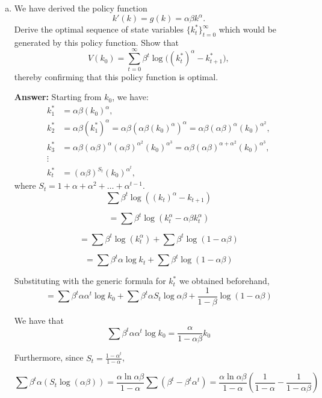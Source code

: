 \documentclass[11pt]{extarticle}
\theoremstyle{plain}
\theoremstyle{definition}
\begin{document}
\begin{enumerate}[(a)]
\begin{enumerate}[(a)]
\item We have derived the policy function
\begin{equation*}
	k'(k) = g(k) = \alpha \beta k^\alpha.
\end{equation*}
Derive the optimal sequence of state variables $\{k_t^*\}_{t=0}^\infty$ which would be generated by this policy function. Show that 
\begin{equation*}
	V(k_0) = \sum_{t=0}^\infty \beta^t \log \bigg( (k_t^*)^\alpha - k_{t+1}^* \bigg),
\end{equation*}
thereby confirming that this policy function is optimal.

\textbf{Answer: } 
Starting from $k_0$, we have:
\[
\begin{aligned}
k_1^* &= \alpha \beta (k_0)^\alpha, \\
k_2^* &= \alpha \beta (k_1^*)^\alpha = \alpha \beta \left( \alpha \beta (k_0)^\alpha \right)^\alpha = \alpha \beta (\alpha \beta)^\alpha (k_0)^{\alpha^2}, \\
k_3^* &= \alpha \beta (\alpha \beta)^{\alpha} (\alpha \beta)^{\alpha^2} (k_0)^{\alpha^3} = \alpha \beta (\alpha \beta)^{\alpha + \alpha^2} (k_0)^{\alpha^3}, \\
\vdots \\
k_t^* &= (\alpha \beta)^{S_t} (k_0)^{\alpha^t},
\end{aligned}
\]
where $S_t = 1 + \alpha + \alpha^2 + \dots + \alpha^{t-1}$.
\[
\sum \beta^t \log((k_t)^\alpha - k_{t+1})
\]

\[
= \sum \beta^t \log \left( k_t^\alpha - \alpha \beta k_t^\alpha \right)
\]

\[
= \sum \beta^t \log \left( k_t^\alpha \right) + \sum \beta^t \log (1 - \alpha \beta)
\]

\[
= \sum \beta^t \alpha \log k_t + \sum \beta^t \log (1 - \alpha \beta)
\]

Substituting with the generic formula for $k_t^*$ we obtained beforehand,
\[
= \sum \beta^t \alpha \alpha^t \log k_0 + \sum \beta^t  \alpha S_t \log \alpha \beta + \frac{1}{1-\beta} \log (1 - \alpha \beta) 
\]

We have that 
\[
\sum \beta^t \alpha \alpha^t \log k_0=  \frac{\alpha}{1 - \alpha \beta} k_0
\]

Furthermore, since \( S_t = \frac{1 - \alpha^t}{1 - \alpha} \),

\[
\sum \beta^t \alpha \left( S_t \log (\alpha \beta) \right) = \frac{\alpha \ln \alpha \beta}{1 - \alpha} \sum \left( \beta^t - \beta^t \alpha^t \right) = \frac{\alpha \ln \alpha \beta}{1 - \alpha} \left( \frac{1}{1 - \alpha} - \frac{1}{1 - \alpha \beta} \right)
\]


\end{enumerate}
\end{enumerate}
\end{document}
